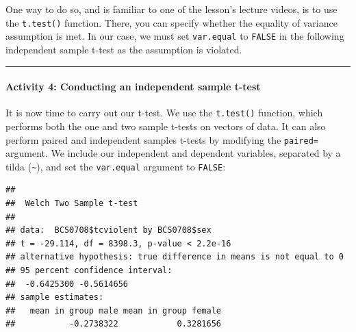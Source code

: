 \documentclass[
]{book}
\newenvironment{Shaded}{\begin{snugshade}}{\end{snugshade}}
\newcommand{\AttributeTok}[1]{\textcolor[rgb]{0.77,0.63,0.00}{#1}}
\newcommand{\CommentTok}[1]{\textcolor[rgb]{0.56,0.35,0.01}{\textit{#1}}}
\newcommand{\ConstantTok}[1]{\textcolor[rgb]{0.00,0.00,0.00}{#1}}
\newcommand{\FunctionTok}[1]{\textcolor[rgb]{0.00,0.00,0.00}{#1}}
\newcommand{\NormalTok}[1]{#1}
\newcommand{\OtherTok}[1]{\textcolor[rgb]{0.56,0.35,0.01}{#1}}
\newcommand{\SpecialCharTok}[1]{\textcolor[rgb]{0.00,0.00,0.00}{#1}}
\begin{document}
One way to do so, and is familiar to one of the lesson's lecture videos, is to use the \texttt{t.test()} function. There, you can specify whether the equality of variance assumption is met. In our case, we must set \texttt{var.equal} to \texttt{FALSE} in the following independent sample t-test as the assumption is violated.

\begin{center}\rule{0.5\linewidth}{0.5pt}\end{center}

\hypertarget{activity-4-conducting-an-independent-sample-t-test}{%
\paragraph{Activity 4: Conducting an independent sample t-test}\label{activity-4-conducting-an-independent-sample-t-test}}

It is now time to carry out our t-test. We use the \texttt{t.test()} function, which performs both the one and two sample t-tests on vectors of data. It can also perform paired and independent samples t-tests by modifying the \texttt{paired=} argument. We include our independent and dependent variables, separated by a tilda (\texttt{\textasciitilde{}}), and set the \texttt{var.equal} argument to \texttt{FALSE}:

\begin{Shaded}
\end{Shaded}

\begin{verbatim}
## 
##  Welch Two Sample t-test
## 
## data:  BCS0708$tcviolent by BCS0708$sex
## t = -29.114, df = 8398.3, p-value < 2.2e-16
## alternative hypothesis: true difference in means is not equal to 0
## 95 percent confidence interval:
##  -0.6425300 -0.5614656
## sample estimates:
##   mean in group male mean in group female 
##           -0.2738322            0.3281656
\end{verbatim}

\begin{Shaded}
\end{Shaded}
\end{document}
